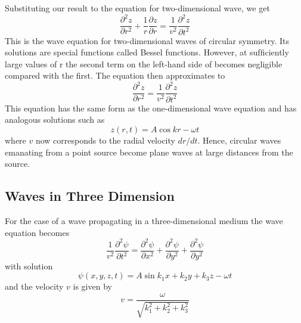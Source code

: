 \documentclass[../../../main.tex]{subfiles}
\begin{document}
Substituting our result to the equation for two-dimensional wave, we get
\begin{equation*}
    \frac{\partial^2 z}{\partial r^2}+\frac{1}{r}\frac{\partial z}{\partial r}=\frac{1}{v^2}\frac{\partial^2 z}{\partial t^2}
\end{equation*}
This is the wave equation for two-dimensional waves of circular symmetry. Its solutions are special functions called Bessel functions. However, at sufﬁciently large values of r the second term on the left-hand side of becomes negligible compared with the ﬁrst. The equation then approximates to
\begin{equation*}
    \frac{\partial^2 z}{\partial r^2}=\frac{1}{v^2}\frac{\partial^2 z}{\partial t^2}
\end{equation*}
This equation has the same form as the one-dimensional wave equation and has analogous solutions such as
\begin{equation*}
    z(r,t)=A\cos kr-\omega t
\end{equation*}
where $v$ now corresponds to the radial velocity $dr/dt$. Hence, circular waves emanating from a point source become plane waves at large distances from the source.

\subsection{Waves in Three Dimension}
For the case of a wave propagating in a three-dimensional medium the wave equation becomes
\begin{equation*}
    \frac{1}{v^2}\frac{\partial^2 \psi}{\partial t^2}=  \frac{\partial^2 \psi}{\partial x^2} + \frac{\partial^2 \psi}{\partial y^2} + \frac{\partial^2 \psi}{\partial y^2}
\end{equation*}
with solution
\begin{equation*}
    \psi(x,y,z,t)=A\sin k_1x+k_2y+k_3z-\omega t
\end{equation*}
and the velocity $v$ is given by
\begin{equation*}
    v=\frac{\omega}{\sqrt{k_1^2+k_2^2+k_3^2}}
\end{equation*}
\end{document}
